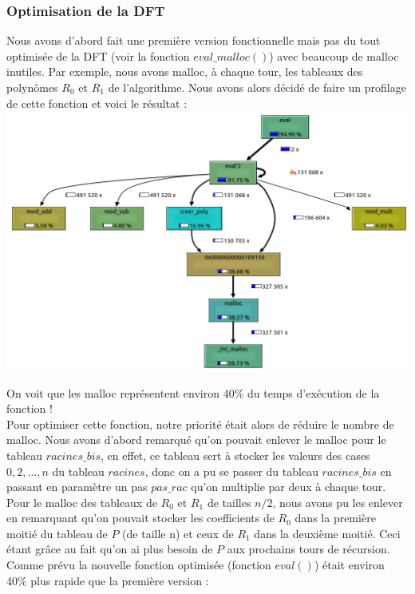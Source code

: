 \documentclass[12pt, a4paper]{article}
\begin{document}
\subsubsection{Optimisation de la DFT}
Nous avons d'abord fait une première version fonctionnelle mais pas du tout optimisée de la DFT (voir la fonction $eval\_malloc()$) avec beaucoup de malloc inutiles. Par exemple, nous avons malloc, à chaque tour, les tableaux des polynômes $R_0$ et $R_1$ de l'algorithme. Nous avons alors décidé de faire un profilage de cette fonction et voici le résultat :
\includegraphics[scale=0.8]{profiler_eval_malloc}

On voit que les malloc représentent environ 40\% du temps d'exécution de la fonction ! \\
Pour optimiser cette fonction, notre priorité était alors de réduire le nombre de malloc. Nous avons d'abord remarqué qu'on pouvait enlever le malloc pour le tableau $racines\_bis$, en effet, ce tableau sert à stocker les valeurs des cases $0,2,\dots,n$ du tableau $racines$, donc on a pu se passer du tableau $racines\_bis$ en passant en paramètre un pas $pas\_rac$ qu'on multiplie par deux à chaque tour. \\
Pour le malloc des tableaux de $R_0$ et $R_1$ de tailles $n/2$, nous avons pu les enlever en remarquant qu'on pouvait stocker les coefficients de $R_0$ dans la première moitié du tableau de $P$ (de taille n) et ceux de $R_1$ dans la deuxième moitié. Ceci étant grâce au fait qu'on ai plus besoin de $P$ aux prochains tours de récursion.
Comme prévu la nouvelle fonction optimisée (fonction $eval()$) était environ 40\% plus rapide que la première version :
\end{document}
